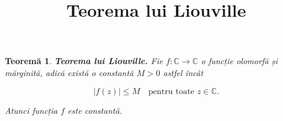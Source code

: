 \documentclass[12pt]{article}
\title{Teorema lui Liouville}
\author{}
\date{}
\theoremstyle{plain}
\newtheorem{theorem}{Teoremă}
\begin{document}
\maketitle

\begin{theorem}
\textbf{Teorema lui Liouville.}  
Fie $f : \mathbb{C} \to \mathbb{C}$ o funcție olomorfă și mărginită, adică există o constantă $M > 0$ astfel încât


\[
|f(z)| \le M \quad \text{pentru toate } z \in \mathbb{C}.
\]


Atunci funcția $f$ este constantă.
\end{theorem}
\end{document}
